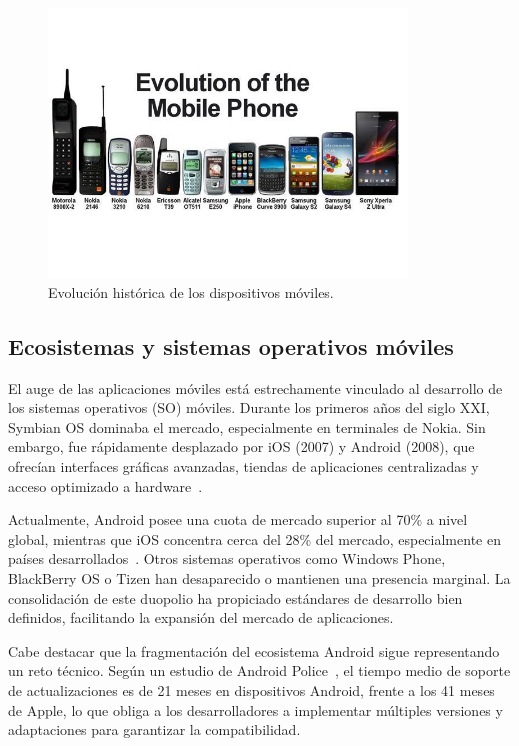 \begin{figure}[H]
    \centering
    \includegraphics[width=0.85\textwidth]{figs/evolucion_moviles.jpg}
    \caption{Evolución histórica de los dispositivos móviles.}
    \label{fig:evolucion_moviles}
\end{figure}

\subsection{Ecosistemas y sistemas operativos móviles}
\vspace{-1.5ex}

El auge de las aplicaciones móviles está estrechamente vinculado al desarrollo de los sistemas operativos (SO) móviles. Durante los primeros años del siglo XXI, Symbian OS dominaba el mercado, especialmente en terminales de Nokia. Sin embargo, fue rápidamente desplazado por iOS (2007) y Android (2008), que ofrecían interfaces gráficas avanzadas, tiendas de aplicaciones centralizadas y acceso optimizado a hardware~\cite{statcounter2024}.

Actualmente, Android posee una cuota de mercado superior al 70\% a nivel global, mientras que iOS concentra cerca del 28\% del mercado, especialmente en países desarrollados~\cite{statista2024}. Otros sistemas operativos como Windows Phone, BlackBerry OS o Tizen han desaparecido o mantienen una presencia marginal. La consolidación de este duopolio ha propiciado estándares de desarrollo bien definidos, facilitando la expansión del mercado de aplicaciones.

Cabe destacar que la fragmentación del ecosistema Android sigue representando un reto técnico. Según un estudio de Android Police~\cite{androidpolice2017}, el tiempo medio de soporte de actualizaciones es de 21 meses en dispositivos Android, frente a los 41 meses de Apple, lo que obliga a los desarrolladores a implementar múltiples versiones y adaptaciones para garantizar la compatibilidad.

